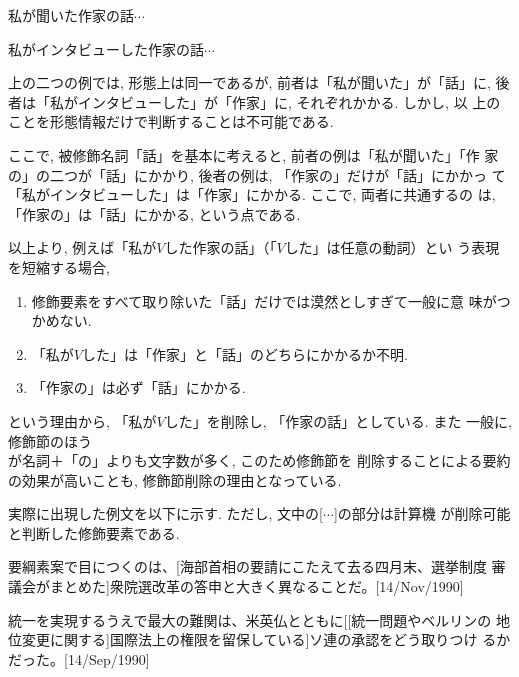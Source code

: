 \begin{sample}
\item 私が聞いた作家の話$\cdots$\label{作例から}
\end{sample}
\begin{sample}
\item 私がインタビューした作家の話$\cdots$\label{作例まで}
\end{sample}

上の二つの例では, 形態上は同一であるが, 前者は「私が聞いた」が「話」に, 
後者は「私がインタビューした」が「作家」に, それぞれかかる. しかし, 以
上のことを形態情報だけで判断することは不可能である. 

ここで, 被修飾名詞「話」を基本に考えると, 前者の例は「私が聞いた」「作
家の」の二つが「話」にかかり, 後者の例は, 「作家の」だけが「話」にかかっ
て「私がインタビューした」は「作家」にかかる. ここで, 両者に共通するの
は, 「作家の」は「話」にかかる, という点である. 

以上より, 例えば「私が$V$した作家の話」（「$V$した」は任意の動詞）とい
う表現を短縮する場合, 

\begin{enumerate}
\item 修飾要素をすべて取り除いた「話」だけでは漠然としすぎて一般に意
味がつかめない. 
\item 「私が$V$した」は「作家」と「話」のどちらにかかるか不明. 
\item 「作家の」は必ず「話」にかかる. 
\end{enumerate}

\noindent
という理由から, 「私が$V$した」を削除し, 「作家の話」としている. また
一般に, 修飾節のほう\\が名詞＋「の」よりも文字数が多く, このため修飾節を
削除することによる要約の効果が高いことも, 修飾節削除の理由となっている. 

実際に出現した例文を以下に示す. ただし, 文中の[$\cdots$]の部分は計算機
が削除可能と判断した修飾要素である. 

\begin{sample}
\item
要綱素案で目につくのは、[海部首相の要請にこたえて去る四月末、選挙制度
審議会がまとめた]衆院選改革の答申と大きく異なることだ。[14/Nov/1990]
\item
統一を実現するうえで最大の難関は、米英仏とともに[[統一問題やベルリンの
地位変更に関する]国際法上の権限を留保している]ソ連の承認をどう取りつけ
るかだった。[14/Sep/1990]\label{double}
\end{sample}

